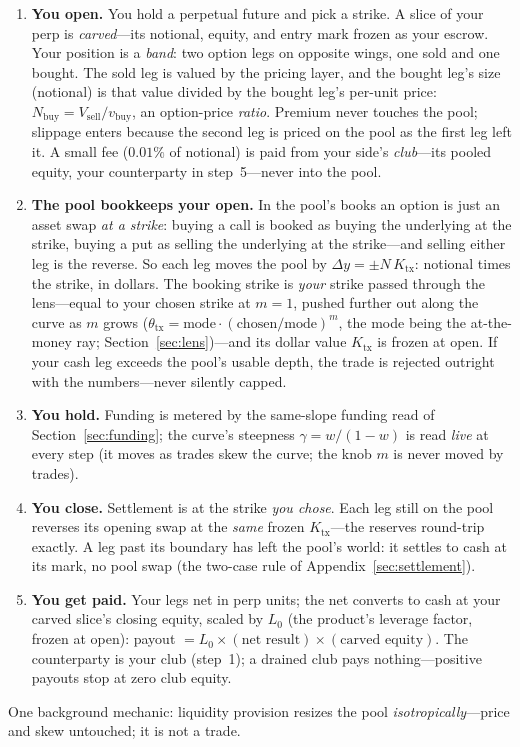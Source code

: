 \documentclass[runningheads]{llncs}
\begin{document}
\begin{enumerate}[leftmargin=2em,itemsep=1pt]
  \item \textbf{You open.} You hold a perpetual future and pick a strike. A
    slice of your perp is \emph{carved}---its notional, equity, and entry
    mark frozen as your escrow. Your position is a \emph{band}: two option
    legs on opposite wings, one sold and one bought. The sold leg is valued
    by the pricing layer, and the bought leg's size (notional) is that value
    divided by the bought leg's per-unit price:
    $N_{\mathrm{buy}}=V_{\mathrm{sell}}/v_{\mathrm{buy}}$, an option-price
    \emph{ratio}. Premium never touches the pool; slippage enters because the
    second leg is priced on the pool as the first leg left it. A small fee
    ($0.01\%$ of notional) is paid from your side's \emph{club}---its pooled
    equity, your counterparty in step~5---never into the pool.
  \item \textbf{The pool bookkeeps your open.} In the pool's books an
    option is just an asset swap \emph{at a strike}: buying a call is booked
    as buying the underlying at the strike, buying a put as selling the
    underlying at the strike---and selling either leg is the reverse. So each
    leg moves the pool by $\Delta y=\pm N\,K_{\mathrm{tx}}$: notional times
    the strike, in dollars. The booking strike is \emph{your} strike passed
    through the lens---equal to your chosen strike at $m=1$, pushed further
    out along the curve as $m$ grows
    ($\theta_{\mathrm{tx}}=\mathrm{mode}\cdot(\mathrm{chosen}/\mathrm{mode})^{m}$,
    the mode being the at-the-money ray; Section~\ref{sec:lens})---and its
    dollar value $K_{\mathrm{tx}}$ is frozen at open. If your cash
    leg exceeds the pool's usable depth, the trade is rejected outright with
    the numbers---never silently capped.
  \item \textbf{You hold.} Funding is metered by the same-slope funding read of
    Section~\ref{sec:funding}; the curve's steepness $\gamma=w/(1-w)$ is
    read \emph{live} at every step (it moves as trades skew the curve; the
    knob $m$ is never moved by trades).
  \item \textbf{You close.} Settlement is at the strike \emph{you chose}.
    Each leg still on the pool reverses its opening swap at the \emph{same}
    frozen $K_{\mathrm{tx}}$---the reserves round-trip exactly. A leg past
    its boundary has left the pool's world: it settles to cash at its mark,
    no pool swap (the two-case rule of Appendix~\ref{sec:settlement}).
  \item \textbf{You get paid.} Your legs net in perp units; the net converts
    to cash at your carved slice's closing equity, scaled by $L_{0}$ (the
    product's leverage factor, frozen at open):
    payout $=L_{0}\times(\text{net result})\times(\text{carved equity})$.
    The counterparty is your club (step~1); a drained club pays
    nothing---positive payouts stop at zero club equity.
\end{enumerate}
One background mechanic: liquidity provision resizes the pool
\emph{isotropically}---price and skew untouched; it is not a trade.
\end{document}
